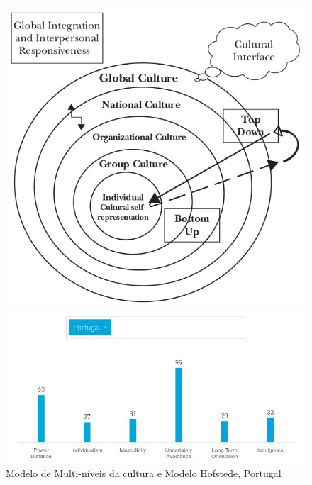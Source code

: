 \begin{figure}[H]
	\begin{minipage}{0.3\linewidth}
		\flushleft
		\includegraphics[scale=0.30]{./image/CORGA/OB/OB_MUltilevelmodelCulture.jpg}
	\end{minipage}
	\hspace{1cm}
	\begin{minipage}{0.4\linewidth}
		\flushleft
		\includegraphics[scale=0.44]{./image/CORGA/OB/Hofstede_pt}
	\end{minipage}
	\caption{Modelo de Multi-níveis \cite{book_11} da cultura e Modelo Hofstede, Portugal}
\end{figure}
